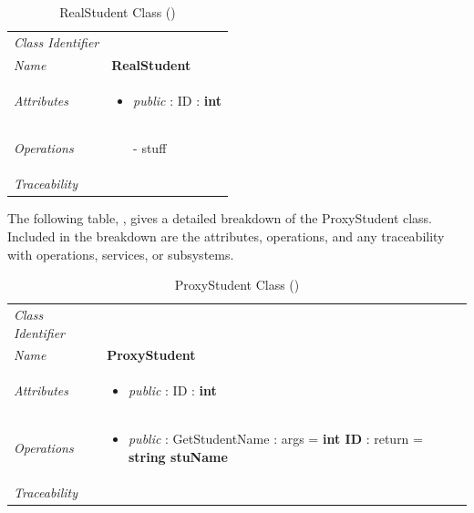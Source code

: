 \documentclass[12pt,letterpaper]{article}
\begin{document}
\begin{table}[H]
    \caption{RealStudent Class ()} 
	\begin{tabu} to 
		\toprule
		Class Identifier &  \\
		Name & {\bf RealStudent} \\
		Attributes & 
		\begin{minipage}[t]{\linewidth}
		    \begin{itemize}
		        \item \textit{public} : ID : \bf{int}
			\end{itemize}
	    \end{minipage} \\

		Operations &
		\begin{minipage}[t]{\linewidth}
			\begin{enumerate}
			    \item[-] stuff
	        \end{enumerate}
	    \end{minipage} \\
	    	Traceability & \\
		\toprule
	\end{tabu}
\end{table}

The following table, , gives a detailed breakdown of the ProxyStudent class. Included in the breakdown are the attributes, operations, and any traceability with operations, services, or subsystems.

\begin{table}[H]
    \caption{ProxyStudent Class ()} 
	\begin{tabu} to 
		\toprule
		Class Identifier &  \\
		Name & {\bf ProxyStudent} \\
		Attributes & 
		\begin{minipage}[t]{\linewidth}
		    \begin{itemize}
		        \item \textit{public} : ID : \bf{int}
			\end{itemize}
	    \end{minipage} \\

		Operations &
		\begin{minipage}[t]{\linewidth}
			\begin{itemize}
			    \item \textit{public} : GetStudentName : args = {\bf int ID} : return = {\bf string stuName}
	        \end{itemize}
	    \end{minipage} \\
	    	Traceability & \\
		\toprule
	\end{tabu}
\end{table}
\end{document}
